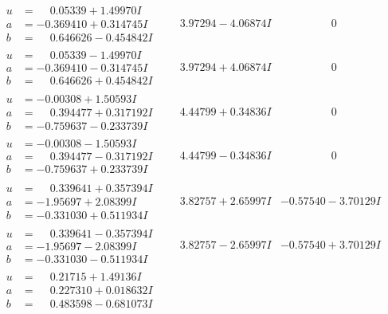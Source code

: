 \documentclass[1p]{elsarticle_modified}
\theoremstyle{definition}
\begin{document}
$$\begin{array}{c|c|c}
\begin{aligned}
u &= \phantom{-}0.05339 + 1.49970 I \\
a &= -0.369410 + 0.314745 I \\
b &= \phantom{-}0.646626 - 0.454842 I\end{aligned}
 & \phantom{-}3.97294 - 4.06874 I & \phantom{-0.000000 } 0 \\ \hline\begin{aligned}
u &= \phantom{-}0.05339 - 1.49970 I \\
a &= -0.369410 - 0.314745 I \\
b &= \phantom{-}0.646626 + 0.454842 I\end{aligned}
 & \phantom{-}3.97294 + 4.06874 I & \phantom{-0.000000 } 0 \\ \hline\begin{aligned}
u &= -0.00308 + 1.50593 I \\
a &= \phantom{-}0.394477 + 0.317192 I \\
b &= -0.759637 - 0.233739 I\end{aligned}
 & \phantom{-}4.44799 + 0.34836 I & \phantom{-0.000000 } 0 \\ \hline\begin{aligned}
u &= -0.00308 - 1.50593 I \\
a &= \phantom{-}0.394477 - 0.317192 I \\
b &= -0.759637 + 0.233739 I\end{aligned}
 & \phantom{-}4.44799 - 0.34836 I & \phantom{-0.000000 } 0 \\ \hline\begin{aligned}
u &= \phantom{-}0.339641 + 0.357394 I \\
a &= -1.95697 + 2.08399 I \\
b &= -0.331030 + 0.511934 I\end{aligned}
 & \phantom{-}3.82757 + 2.65997 I & -0.57540 - 3.70129 I \\ \hline\begin{aligned}
u &= \phantom{-}0.339641 - 0.357394 I \\
a &= -1.95697 - 2.08399 I \\
b &= -0.331030 - 0.511934 I\end{aligned}
 & \phantom{-}3.82757 - 2.65997 I & -0.57540 + 3.70129 I \\ \hline\begin{aligned}
u &= \phantom{-}0.21715 + 1.49136 I \\
a &= \phantom{-}0.227310 + 0.018632 I \\
b &= \phantom{-}0.483598 - 0.681073 I\end{aligned}

\end{array}$$
\end{document}
